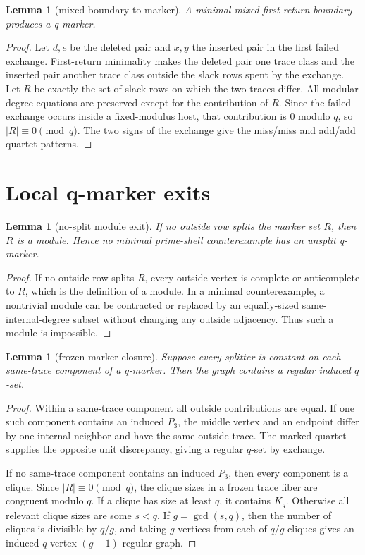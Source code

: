 \documentclass[11pt]{article}
\newtheorem{lemma}[theorem]{Lemma}
\theoremstyle{remark}
\begin{document}
\begin{lemma}[mixed boundary to marker]\label{lem:marker}
A minimal mixed first-return boundary produces a q-marker.
\end{lemma}

\begin{proof}
Let \(d,e\) be the deleted pair and \(x,y\) the inserted pair in the first failed
exchange.  First-return minimality makes the deleted pair one trace class and
the inserted pair another trace class outside the slack rows spent by the
exchange.  Let \(R\) be exactly the set of slack rows on which the two traces
differ.  All modular degree equations are preserved except for the contribution
of \(R\).  Since the failed exchange occurs inside a fixed-modulus host, that
contribution is \(0\) modulo \(q\), so \(|R|\equiv0\pmod q\).  The two signs of
the exchange give the miss/miss and add/add quartet patterns.
\end{proof}

\section{Local q-marker exits}

\begin{lemma}[no-split module exit]\label{lem:module}
If no outside row splits the marker set \(R\), then \(R\) is a module.  Hence no
minimal prime-shell counterexample has an unsplit q-marker.
\end{lemma}

\begin{proof}
If no outside row splits \(R\), every outside vertex is complete or
anticomplete to \(R\), which is the definition of a module.  In a minimal
counterexample, a nontrivial module can be contracted or replaced by an
equally-sized same-internal-degree subset without changing any outside
adjacency.  Thus such a module is impossible.
\end{proof}

\begin{lemma}[frozen marker closure]\label{lem:frozen}
Suppose every splitter is constant on each same-trace component of a q-marker.
Then the graph contains a regular induced \(q\)-set.
\end{lemma}

\begin{proof}
Within a same-trace component all outside contributions are equal.  If one such
component contains an induced \(P_3\), the middle vertex and an endpoint differ
by one internal neighbor and have the same outside trace.  The marked quartet
supplies the opposite unit discrepancy, giving a regular \(q\)-set by exchange.

If no same-trace component contains an induced \(P_3\), then every component is
a clique.  Since \(|R|\equiv0\pmod q\), the clique sizes in a frozen trace fiber
are congruent modulo \(q\).  If a clique has size at least \(q\), it contains
\(K_q\).  Otherwise all relevant clique sizes are some \(s<q\).  If
\(g=\gcd(s,q)\), then the number of cliques is divisible by \(q/g\), and taking
\(g\) vertices from each of \(q/g\) cliques gives an induced \(q\)-vertex
\((g-1)\)-regular graph.
\end{proof}
\end{document}
